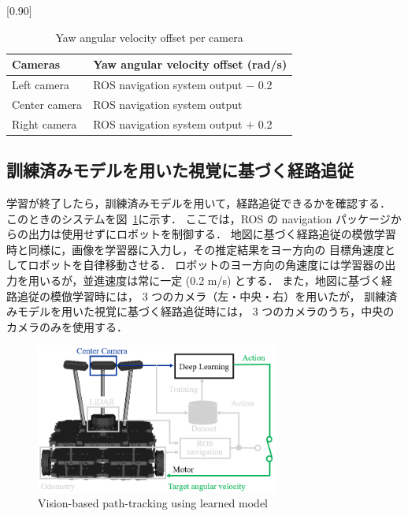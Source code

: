 \documentclass{jarticle}
\renewcommand{\figurename}{図~}
\newcommand{\figref}[1]{\figurename\ref{#1}}
\begin{document}
\begin{table}[h!]
  \centering
  \caption{Yaw angular velocity offset per camera}
  \label{table:1}
    \scalebox{0.90}[0.90]{
    \begin{tabular}{|l||l|}
      \hline
      Cameras & Yaw angular velocity offset (rad/s)\\
      \hline\hline
      Left camera & ROS navigation system output $-$ 0.2\\
      \hline
      Center camera & ROS navigation system output\\
      \hline
      Right camera & ROS navigation system output $+$ 0.2\\
      \hline
    \end{tabular} }
\end{table}

\subsection{訓練済みモデルを用いた視覚に基づく経路追従}
学習が終了したら，訓練済みモデルを用いて，経路追従できるかを確認する．
このときのシステムを\figref{fig:4}に示す．
ここでは，ROS の navigation パッケージからの出力は使用せずにロボットを制御する．
地図に基づく経路追従の模倣学習時と同様に，画像を学習器に入力し，その推定結果をヨー方向の
目標角速度としてロボットを自律移動させる．
ロボットのヨー方向の角速度には学習器の出力を用いるが，並進速度は常に一定 (0.2 m/s) とする．
また，地図に基づく経路追従の模倣学習時には， 3 つのカメラ（左・中央・右）を用いたが，
訓練済みモデルを用いた視覚に基づく経路追従時には， 3 つのカメラのうち，中央のカメラのみを使用する．

\begin{figure}[h!]
  \centering
   \includegraphics[height=49mm]{./png/afterlearn.png}
   \caption{Vision-based path-tracking using learned model}
   \label{fig:4}
\end{figure}
\end{document}
